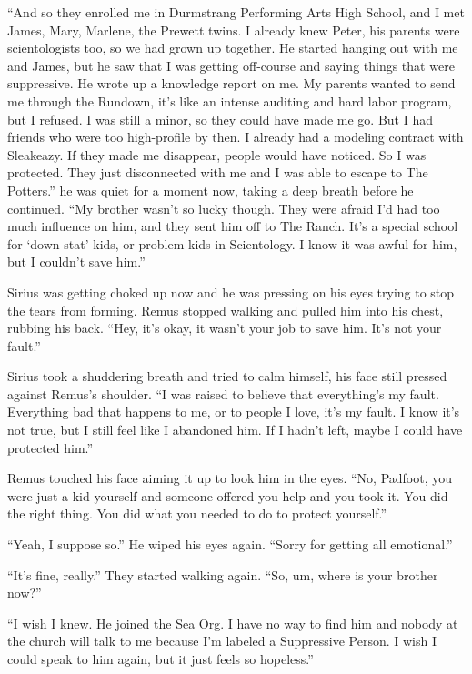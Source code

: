 \documentclass[12pt,twoside,openright]{memoir}
\begin{document}
``And so they enrolled me in Durmstrang Performing Arts High School, and I met James, Mary, Marlene, the Prewett twins. I already knew Peter, his parents were scientologists too, so we had grown up together. He started hanging out with me and James, but he saw that I was getting off-course and saying things that were suppressive. He wrote up a knowledge report on me. My parents wanted to send me through the Rundown, it's like an intense auditing and hard labor program, but I refused. I was still a minor, so they could have made me go. But I had friends who were too high-profile by then. I already had a modeling contract with Sleakeazy. If they made me disappear, people would have noticed. So I was protected. They just disconnected with me and I was able to escape to The Potters.'' he was quiet for a moment now, taking a deep breath before he continued. ``My brother wasn't so lucky though. They were afraid I'd had too much influence on him, and they sent him off to The Ranch. It's a special school for `down-stat' kids, or problem kids in Scientology. I know it was awful for him, but I couldn't save him.''

Sirius was getting choked up now and he was pressing on his eyes trying to stop the tears from forming. Remus stopped walking and pulled him into his chest, rubbing his back. ``Hey, it's okay, it wasn't your job to save him. It's not your fault.''

Sirius took a shuddering breath and tried to calm himself, his face still pressed against Remus's shoulder. ``I was raised to believe that everything's my fault. Everything bad that happens to me, or to people I love, it's my fault. I know it's not true, but I still feel like I abandoned him. If I hadn't left, maybe I could have protected him.''

Remus touched his face aiming it up to look him in the eyes. ``No, Padfoot, you were just a kid yourself and someone offered you help and you took it. You did the right thing. You did what you needed to do to protect yourself.''

``Yeah, I suppose so.'' He wiped his eyes again. ``Sorry for getting all emotional.''

``It's fine, really.'' They started walking again. ``So, um, where is your brother now?''

``I wish I knew. He joined the Sea Org. I have no way to find him and nobody at the church will talk to me because I'm labeled a Suppressive Person. I wish I could speak to him again, but it just feels so hopeless.''
\end{document}
